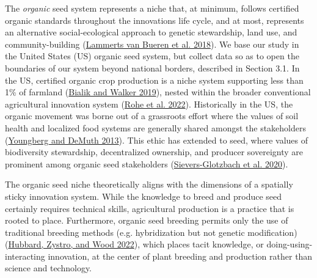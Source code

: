 \documentclass[twoside,12pt,final]{ucthesis-CA2012}
\begin{document}
\begin{ucmainmatter}
The \emph{organic} seed system represents a niche that, at minimum, follows
certified organic standards throughout the innovation\textquotesingle s life cycle, and
at most, represents an alternative social-ecological approach to genetic
stewardship, land use, and community-building (\protect\hyperlink{ref-Lammerts_van_Bueren_Struik_van_Eekeren_Nuijten_2018}{Lammerts van Bueren et al. 2018}). We
base our study in the United States (US) organic seed system, but
collect data so as to open the boundaries of our system beyond national
borders, described in Section 3.1. In the US, certified organic crop
production is a niche system supporting less than 1\% of farmland
(\protect\hyperlink{ref-Bialik_Walker_2019}{Bialik and Walker 2019}), nested
within the broader conventional agricultural innovation system
(\protect\hyperlink{ref-Rohe_Oltmer_Wolter_Gmeiner_Tschersich_2022}{Rohe et al. 2022}).
Historically in the US, the organic movement was borne out of a
grassroots effort where the values of soil health and localized food
systems are generally shared amongst the stakeholders
(\protect\hyperlink{ref-Youngberg_DeMuth_2013}{Youngberg and DeMuth 2013}).
This ethic has extended to seed, where values of biodiversity
stewardship, decentralized ownership, and producer sovereignty are
prominent among organic seed stakeholders
(\protect\hyperlink{ref-Sievers-Glotzbach_Tschersich_Gmeiner_Kliem_Ficiciyan_2020}{Sievers-Glotzbach et al. 2020}).

The organic seed niche theoretically aligns with the dimensions of a
spatially sticky innovation system. While the knowledge to breed and
produce seed certainly requires technical skills, agricultural
production is a practice that is rooted to place. Furthermore, organic
seed breeding permits only the use of traditional breeding methods (e.g.
hybridization but not genetic modification)
(\protect\hyperlink{ref-Hubbard_Zystro_Wood_2022}{Hubbard, Zystro, and Wood 2022}),
which places tacit knowledge, or \textquotesingle doing-using-interacting\textquotesingle{} innovation,
at the center of plant breeding and production rather than science and
technology.


\end{ucmainmatter}
\end{document}
